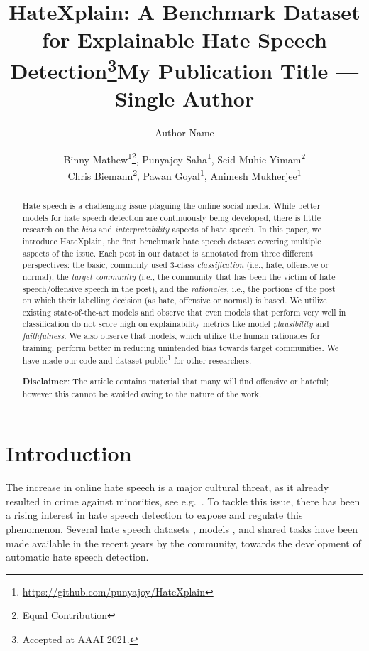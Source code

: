 \documentclass[letterpaper]{article} \usepackage{aaai21}  \usepackage{times}  \usepackage{helvet} \usepackage{courier}  \usepackage[hyphens]{url}  \usepackage{graphicx} \urlstyle{rm} \def\UrlFont{\rm}  \usepackage{natbib}  \usepackage{caption}
\title{{\bf{HateXplain}}: A Benchmark Dataset for Explainable Hate Speech Detection\thanks{Accepted at AAAI 2021.}}
\title{My Publication Title --- Single Author}
\author {
Author Name \\
}
\author {


        Binny Mathew\textsuperscript{\rm 1}\thanks{Equal Contribution}, 
        Punyajoy Saha\textsuperscript{\rm 1}\footnotemark[2], 
        Seid Muhie Yimam\textsuperscript{\rm 2} \\
        Chris Biemann\textsuperscript{\rm 2},  
        Pawan Goyal\textsuperscript{\rm 1},  
        Animesh Mukherjee\textsuperscript{\rm 1} \\
}
\begin{document}
\maketitle

\begin{abstract}
Hate speech is a challenging issue plaguing the online social media.
While better models for hate speech detection are continuously being developed, there is little research on the \textit{bias} and \textit{interpretability} aspects of hate speech. In this paper, we introduce {HateXplain}, the first benchmark hate speech dataset covering multiple aspects of the issue. Each post in our dataset is annotated from three different perspectives: the basic, commonly used 3-class
\textit{classification} (i.e., hate, offensive or normal), the \textit{target community} (i.e., the community that has been the victim of hate speech/offensive speech in the post), and the \textit{rationales}, i.e., the portions of the post on which their labelling decision (as hate, offensive or normal) is based. We utilize existing state-of-the-art models and observe that even models that perform very well in classification do not score high on explainability metrics like model \textit{plausibility} and \textit{faithfulness}. We also observe that models, which utilize the human rationales for training, perform better in reducing unintended bias towards target communities.
We have made our code and dataset public\footnote{\label{dataset_link}\url{https://github.com/punyajoy/HateXplain}} for other researchers.


\textbf{Disclaimer}: The article contains material that many will find offensive or hateful; however this cannot be avoided owing to the nature of the work.
\end{abstract}


\section{Introduction}
The increase in online hate speech is a major cultural threat, as it already resulted in crime against minorities, see e.g.~\cite{williams2019hate}. To tackle this issue, there has been a rising interest in  hate speech detection to expose and regulate this phenomenon. Several hate speech datasets \cite{ousidhoum2019multilingual,qian2019learning,de2018hate,sanguinetti2018italian}, models \cite{zhang2018detecting,mishra2018author,qian2018leveraging,qian2018hierarchical}, and shared tasks \cite{basile2019semeval,bosco2018overview} have been made available in the recent years by the community, towards the development of automatic hate speech detection.
\end{document}
